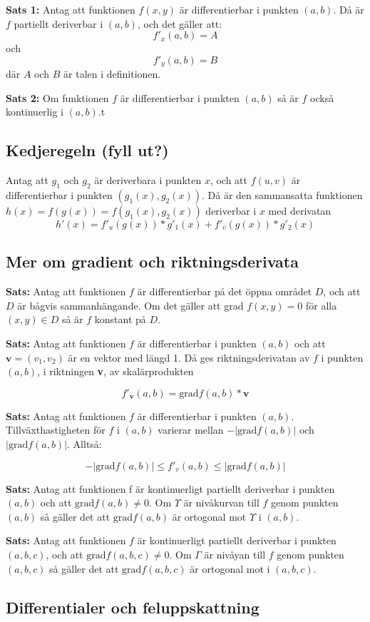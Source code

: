 \documentclass[a4paper,12pt]{article}
\begin{document}
\textbf{Sats 1:} Antag att funktionen $f(x, y)$ är differentierbar i punkten $(a, b)$. Då är $f$ partiellt deriverbar i $(a, b)$, och det gäller att:
\[
    f'_x(a, b) = A 
\]
och
\[
    f'_y(a, b) = B
\]
där $A$ och $B$ är talen i definitionen.

\textbf{Sats 2:} Om funktionen $f$ är differentierbar i punkten $(a, b)$ så är $f$ också kontinuerlig i $(a, b)$.t

\subsection{Kedjeregeln (fyll ut?)}
Antag att $g_1$ och $g_2$ är deriverbara i punkten $x$, och att $f(u, v)$ är differentierbar i punkten $(g_1(x), g_2(x))$.
Då är den sammansatta funktionen $h(x) = f(g(x)) = f(g_1(x), g_2(x))$ deriverbar i $x$ med derivatan
\[
    h'(x) = f'_u(g(x)) * g'_1(x) + f'_v(g(x))*g'_2(x)
\]

\subsection{Mer om gradient och riktningsderivata}
\textbf{Sats:} Antag att funktionen $f$ är differentierbar på det öppna området $D$, och att $D$ är bågvis sammanhängande. 
Om det gäller att grad $f(x, y) = 0$ för alla $(x, y) \in D$ så är $f$ konstant på $D$.

\textbf{Sats:} Antag att funktionen $f$ är differentierbar i punkten $(a, b)$ och att $\textbf{v} = (v_1, v_2)$ är en vektor med längd 1.
Då ges riktningsderivatan av $f$ i punkten $(a, b)$, i riktningen \textbf{v}, av skalärprodukten

\[
    f'_\textbf{v}(a, b) = \text{grad} f(a, b)*\textbf{v}
\]

\textbf{Sats:} Antag att funktionen $f$ är differentierbar i punkten $(a, b)$. Tillväxthastigheten för $f$ i $(a, b)$ varierar mellan $-|\text{grad} f(a, b)|$ och $|\text{grad} f(a, b)|$. Alltså:

\[
    -|\text{grad} f(a, b)| \leq f'_v(a, b) \leq |\text{grad} f(a, b)|
\]

\textbf{Sats:} Antag att funktionen f är kontinuerligt partiellt deriverbar i punkten $(a, b)$ och att $\text{grad} f(a, b) \neq 0$. 
Om $\Upsilon$ är nivåkurvan till $f$ genom punkten $(a, b)$ så gäller det att $\text{grad} f(a, b)$ är ortogonal mot $\Upsilon$ i $(a, b)$.

\textbf{Sats:} Antag att funktionen $f$ är kontinuerligt partiellt deriverbar i punkten $(a, b, c)$, och att $\text{grad} f(a, b, c) \neq 0$. 
Om $\Gamma$ är nivåyan till $f$ genom punkten $(a, b, c)$ så gäller det att $\text{grad} f(a, b, c)$ är ortogonal mot \Gamma i $(a, b, c)$.

\subsection{Differentialer och feluppskattning}
\end{document}
